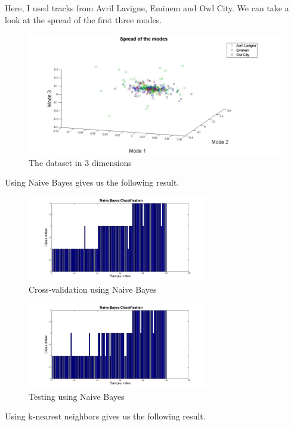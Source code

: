 \documentclass[a4paper]{article}
\begin{document}
Here, I used tracks from Avril Lavigne, Eminem and Owl City. We can take a look at the spread of the first three modes.

\begin{figure}[H] 
	\centering
	\includegraphics[width=1\textwidth]{spread.jpg}
	\caption{The dataset in 3 dimensions}	
\end{figure}

 Using Naive Bayes gives us the following result.

\begin{figure}[H] 
	\centering
	\includegraphics[width=0.7\textwidth]{NB1.jpg}
	\caption{Cross-validation using Naive Bayes}	
\end{figure}

\begin{figure}[H] 
	\centering
	\includegraphics[width=0.7\textwidth]{Naivebayes.jpg}
	\caption{Testing using Naive Bayes}	
\end{figure}

Using k-nearest neighbors gives us the following result.
\end{document}
